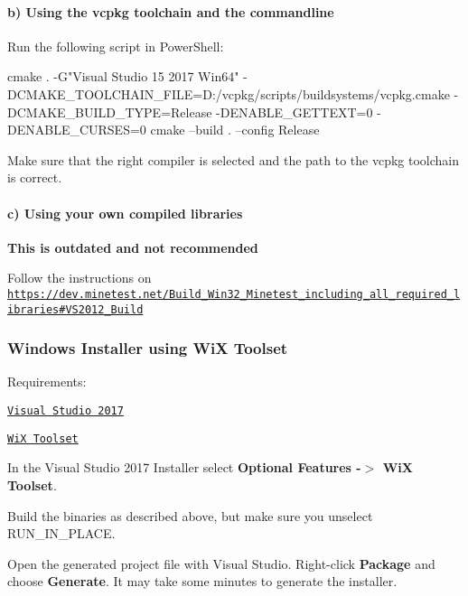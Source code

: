 \paragraph*{b) Using the vcpkg toolchain and the commandline}

Run the following script in Power\+Shell\+:


\begin{DoxyCode}
cmake . -G"Visual Studio 15 2017 Win64" -DCMAKE\_TOOLCHAIN\_FILE=D:/vcpkg/scripts/buildsystems/vcpkg.cmake
       -DCMAKE\_BUILD\_TYPE=Release -DENABLE\_GETTEXT=0 -DENABLE\_CURSES=0
cmake --build . --config Release
\end{DoxyCode}
 Make sure that the right compiler is selected and the path to the vcpkg toolchain is correct.

\paragraph*{c) Using your own compiled libraries}

{\bfseries This is outdated and not recommended}

Follow the instructions on \href{https://dev.minetest.net/Build_Win32_Minetest_including_all_required_libraries#VS2012_Build}{\tt https\+://dev.\+minetest.\+net/\+Build\+\_\+\+Win32\+\_\+\+Minetest\+\_\+including\+\_\+all\+\_\+required\+\_\+libraries\#\+V\+S2012\+\_\+\+Build}

\subsubsection*{Windows Installer using WiX Toolset}

Requirements\+:
\begin{DoxyItemize}
\item \href{https://visualstudio.microsoft.com/}{\tt Visual Studio 2017}
\item \href{https://wixtoolset.org/}{\tt WiX Toolset}
\end{DoxyItemize}

In the Visual Studio 2017 Installer select {\bfseries Optional Features -\/$>$ WiX Toolset}.

Build the binaries as described above, but make sure you unselect {\ttfamily R\+U\+N\+\_\+\+I\+N\+\_\+\+P\+L\+A\+CE}.

Open the generated project file with Visual Studio. Right-\/click {\bfseries Package} and choose {\bfseries Generate}. It may take some minutes to generate the installer.

